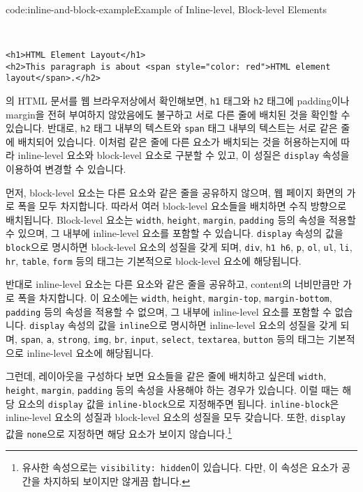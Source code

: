 \begin{codeenv}{code:inline-and-block-example}{Example of Inline-level, Block-level Elements}\begin{verbatim}


<h1>HTML Element Layout</h1>
<h2>This paragraph is about <span style="color: red">HTML element layout</span>.</h2>
\end{verbatim}
\end{codeenv}

의 HTML 문서를 웹 브라우저상에서 확인해보면, \texttt{h1} 태그와 \texttt{h2} 태그에 padding이나 margin을 전혀 부여하지 않았음에도 불구하고 서로 다른 줄에 배치된 것을 확인할 수 있습니다. 반대로, \texttt{h2} 태그 내부의 텍스트와 \texttt{span} 태그 내부의 텍스트는 서로 같은 줄에 배치되어 있습니다. 이처럼 같은 줄에 다른 요소가 배치되는 것을 허용하는지에 따라 inline-level 요소와 block-level 요소로 구분할 수 있고, 이 성질은 \texttt{display} 속성을 이용하여 변경할 수 있습니다. 

먼저, block-level 요소는 다른 요소와 같은 줄을 공유하지 않으며, 웹 페이지 화면의 가로 폭을 모두 차지합니다. 따라서 여러 block-level 요소들을 배치하면 수직 방향으로 배치됩니다. Block-level 요소는 \texttt{width}, \texttt{height}, \texttt{margin}, \texttt{padding} 등의 속성을 적용할 수 있으며, 그 내부에 inline-level 요소를 포함할 수 있습니다. \texttt{display} 속성의 값을 \texttt{block}으로 명시하면 block-level 요소의 성질을 갖게 되며, \texttt{div}, \texttt{h1}~\texttt{h6}, \texttt{p}, \texttt{ol}, \texttt{ul}, \texttt{li}, \texttt{hr}, \texttt{table}, \texttt{form} 등의 태그는 기본적으로 block-level 요소에 해당됩니다. 

반대로 inline-level 요소는 다른 요소와 같은 줄을 공유하고, content의 너비만큼만 가로 폭을 차지합니다. 이 요소에는 \texttt{width}, \texttt{height}, \texttt{margin-top}, \texttt{margin-bottom}, \texttt{padding} 등의 속성을 적용할 수 없으며, 그 내부에 inline-level 요소를 포함할 수 없습니다. \texttt{display} 속성의 값을 \texttt{inline}으로 명시하면 inline-level 요소의 성질을 갖게 되며, \texttt{span}, \texttt{a}, \texttt{strong}, \texttt{img}, \texttt{br}, \texttt{input}, \texttt{select}, \texttt{textarea}, \texttt{button} 등의 태그는 기본적으로 inline-level 요소에 해당됩니다. 

그런데, 레이아웃을 구성하다 보면 요소들을 같은 줄에 배치하고 싶은데 \texttt{width}, \texttt{height}, \texttt{margin}, \texttt{padding} 등의 속성을 사용해야 하는 경우가 있습니다. 이럴 때는 해당 요소의 \texttt{display} 값을 \texttt{inline-block}으로 지정해주면 됩니다. \texttt{inline-block}은 inline-level 요소의 성질과 block-level 요소의 성질을 모두 갖습니다. 또한, \texttt{display} 값을 \texttt{none}으로 지정하면 해당 요소가 보이지 않습니다.\footnote{유사한 속성으로는 \texttt{visibility: hidden}이 있습니다. 다만, 이 속성은 요소가 공간을 차지하되 보이지만 않게끔 합니다.}
 
